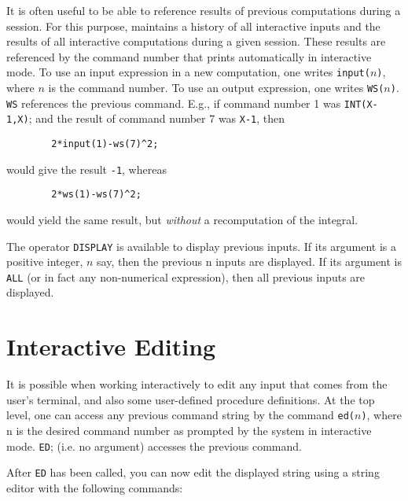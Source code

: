 \hypertarget{reserved:INPUT}{}
\hypertarget{reserved:WS}{}
It is often useful to be able to reference results of previous
computations during a {\REDUCE} session.  For this purpose, {\REDUCE}
maintains a history of all interactive inputs and the
results of all interactive computations during a given session.  These
results are referenced by the command number that {\REDUCE} prints
automatically in interactive mode.  To use an input expression in a new
computation, one writes \texttt{input(}$n$\texttt{)}, where
$n$ is the command number.  To use an output expression, one writes 
\texttt{WS(}$n$\texttt{)}. \texttt{WS} references the previous command.
E.g., if command number 1 was \texttt{INT(X-1,X)}; and the result of command
number 7 was \texttt{X-1}, then
\begin{verbatim}
        2*input(1)-ws(7)^2;
\end{verbatim}
would give the result \texttt{-1}, whereas
\begin{verbatim}
        2*ws(1)-ws(7)^2;
\end{verbatim}
would yield the same result, but \emph{without} a recomputation of the
integral.

\hypertarget{operator:DISPLAY}{}
The operator \texttt{DISPLAY} is available to display previous
inputs.  If its argument is a positive integer, $n$ say, then the
previous n inputs are displayed.  If its argument is \texttt{ALL} (or in fact
any non-numerical expression), then all previous inputs are displayed.

\section{Interactive Editing}
\hypertarget{command:ED}{}
It is possible when working interactively to edit any {\REDUCE} input that
comes from the user's terminal, and also some user-defined procedure
definitions.  At the top level, one can access any previous command string
by the command \texttt{ed(}$n$\texttt{)}, where n is the desired
command number as prompted by the system in interactive mode. \texttt{ED};
(i.e. no argument) accesses the previous command.

After \texttt{ED} has been called, you can now edit the displayed string using a
string editor with the following commands:

